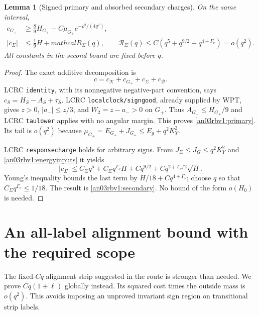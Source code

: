 \documentclass[11pt]{article}
\numberwithin{equation}{section}
\newtheorem{lemma}[theorem]{Lemma}
\theoremstyle{remark}\newtheorem{remark}[theorem]{Remark}
\newcommand{\KK}{\mathcal K}
\newcommand{\BB}{\mathcal B}
\newcommand{\Gp}{G_+}
\begin{document}
\begin{lemma}[Signed primary and absorbed secondary charges]
\label{an03rbv1:explicit}
On the same interval,
\begin{align}
 c_{\Gp}&\ge\frac89H_{\Gp}
                  -C\mu_{\Gp}e^{-\rho^2/(4q^2)},
 \label{an03rbv1:primary}\\
 |c_\Sigma|&\le\frac19H+mathcal R_\Sigma(q),\qquad
 \mathcal R_\Sigma(q)
       \le C(q^5+q^{9/2}+q^{4+\Gamma_\nu})=o(q^2).
 \label{an03rbv1:secondary}
\end{align}
All constants in the second bound are fixed before $q$.
\end{lemma}
\begin{proof}
The exact additive decomposition is
\begin{equation}
 c=c_{\KK}+c_{\Gp}+c_\Sigma+c_{\BB}.
 \label{an03rbv1:ledger}
\end{equation}
LCRC \texttt{identity}, with its nonnegative negative-part
convention, says $c_S=H_S-A_S+\tau_S$.
LCRC \texttt{localclock/signgood}, already supplied by WPT,
gives $z>0$, $|a_-|\le z/3$, and $W_2=z-a_->0$ on $\Gp$.
Thus $A_{\Gp}\le H_{\Gp}/9$ and LCRC \texttt{taulower}
applies with no angular margin. This proves \eqref{an03rbv1:primary}.
Its tail is $o(q^2)$ because
$\mu_{\Gp}=E_{\Gp}+J_{\Gp}\le E_g+q^2K_Y^2$.

LCRC \texttt{responsecharge} holds for arbitrary signs. From
$J_\Sigma\le J_G\le q^2K_Y^2$ and
\eqref{an03rbv1:energyinputs} it yields
\[
 |c_\Sigma|\le C_\Sigma q^5+C_\Sigma q^{\Gamma_\nu}H
       +Cq^{9/2}+Cq^{2+\Gamma_\nu/2}\sqrt H.
\]
Young's inequality bounds the last term by
$H/18+Cq^{4+\Gamma_\nu}$; choose $q$ so that
$C_\Sigma q^{\Gamma_\nu}\le1/18$. The result is
\eqref{an03rbv1:secondary}. No bound of the form $o(H_0)$ is needed.
\end{proof}

\section{An all-label alignment bound with the required scope}
\label{an03rbv1:alignmentsection}
The fixed-$Cq$ alignment strip suggested in the route is stronger
than needed. We prove $Cq(1+\ell)$ globally instead. Its squared
cost times the outside mass is $o(q^2)$. This avoids imposing an
unproved invariant sign region on transitional strip labels.
\end{document}
